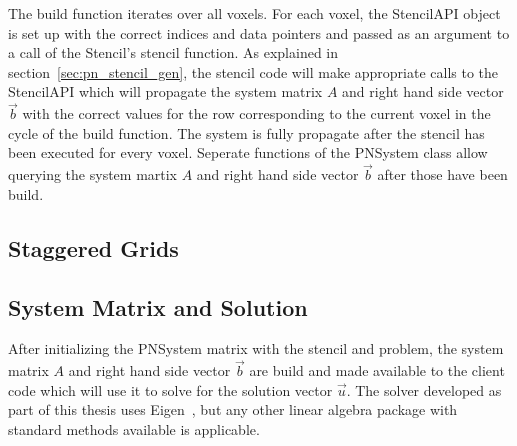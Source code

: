 The build function iterates over all voxels. For each voxel, the StencilAPI object is set up with the correct indices and data pointers and passed as an argument to a call of the Stencil's stencil function. As explained in section~\ref{sec:pn_stencil_gen}, the stencil code will make appropriate calls to the StencilAPI which will propagate the system matrix $A$ and right hand side vector $\vec{b}$ with the correct values for the row corresponding to the current voxel in the cycle of the build function. The system is fully propagate after the stencil has been executed for every voxel. Seperate functions of the PNSystem class allow querying the system martix $A$ and right hand side vector $\vec{b}$ after those have been build.

\subsection{Staggered Grids}
\label{sec:pn_staggered}

\subsection{System Matrix and Solution}
\label{sec:pn_system_matrix}

After initializing the PNSystem matrix with the stencil and problem, the system matrix $A$ and right hand side vector $\vec{b}$ are build and made available to the client code which will use it to solve for the solution vector $\vec{u}$. The solver developed as part of this thesis uses Eigen~\cite{Eigen}, but any other linear algebra package with standard methods available is applicable. 

